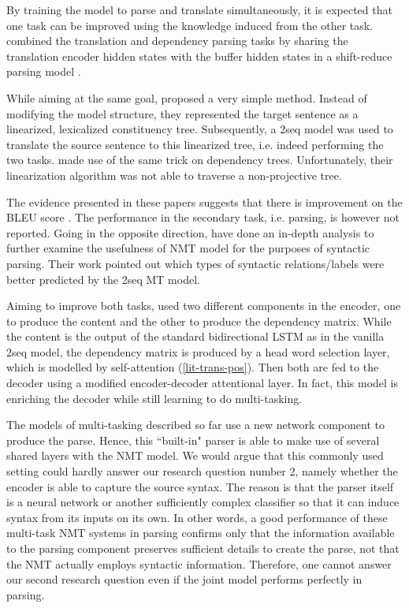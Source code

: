By training the model to parse and translate simultaneously, it is expected that one task can be improved using the knowledge induced from the other task.
\citet{DBLP:conf/acl/EriguchiTC17} combined the translation and dependency parsing tasks by sharing the translation encoder hidden states with the buffer hidden states in a shift-reduce parsing model \cite{DBLP:conf/naacl/DyerKBS16}.

While aiming at the same goal, \citet{DBLP:conf/acl/AharoniG17a} proposed a very simple method.
Instead of modifying the model structure, they represented the target sentence as a linearized, lexicalized constituency tree.
Subsequently, a \seq2seq model was used to translate the source sentence to this linearized tree, i.e. indeed performing the two tasks.
\citet{DBLP:conf/ijcnlp/LeMYM17} made use of the same trick on dependency trees.
Unfortunately, their linearization algorithm was not able to traverse a non-projective tree.

The evidence presented in these papers suggests that there is improvement on the BLEU score \citep{BLEU}.
The performance in the secondary task, i.e. parsing, is however not reported.
Going in the opposite direction, \citet{DBLP:conf/emnlp/ShiPK16} have done an in-depth analysis to further examine the usefulness of NMT model for the purposes of syntactic parsing. Their work pointed out which types of syntactic relations/labels were better predicted by the \seq2seq MT model.

Aiming to improve both tasks, \cite{tran2018inducing} used two different components in the encoder, one to produce the content and the other to produce the dependency matrix.
While the content is the output of the standard bidirectional LSTM as in the vanilla \seq2seq model, the dependency matrix is produced by a head word selection layer, which is modelled by self-attention (\cref{lit-trans-pos}).
Then both are fed to the decoder using a modified encoder-decoder attentional layer.
In fact, this model is enriching the decoder while still learning to do multi-tasking.

The models of multi-tasking described so far use a new network component to produce the parse.
Hence, this ``built-in" parser is able to make use of several shared layers with the NMT model.
We would argue that this commonly used setting could hardly answer our research question number 2, namely whether the encoder is able to capture the source syntax.
The reason is that the parser itself is a neural network or another sufficiently complex classifier so that it can induce syntax from its inputs on its own.
In other words, a good performance of these multi-task NMT systems in parsing confirms only that the information available to the parsing component preserves sufficient details to create the parse, not that the NMT actually employs syntactic information.
Therefore, one cannot answer our second research question even if the joint model performs perfectly in parsing.

